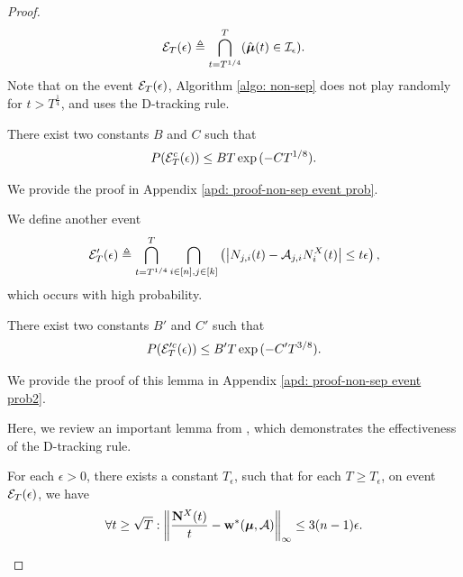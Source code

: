 \begin{proof}
    \begin{align*}
        \mathcal{E}_T(\epsilon) \triangleq \bigcap_{t = T^{1/4}}^T (\hat{\boldsymbol{\mu}}(t) \in \mathcal{I}_{\epsilon}).
    \end{align*}
    Note that on the event $\mathcal{E}_T(\epsilon)$, Algorithm \ref{algo: non-sep} does not play randomly for $t >  T^{\frac{1}{4}}$, and uses the D-tracking rule.

    \begin{lemma} \label{lem: non-sep event prob}
        There exist two constants $B$ and $C$ such that
        \begin{align*}
            P(\mathcal{E}^c_T(\epsilon)) \leq BT \exp{(-CT^{1/8})}.
        \end{align*}
    \end{lemma}
    We provide the proof in Appendix \ref{apd: proof-non-sep event prob}.
    
    We define another event 
    \begin{align*}
            \mathcal{E}'_T(\epsilon) \triangleq \bigcap_{t = T^{1/4}}^T \bigcap_{i \in [n], j \in [k]} \left(\left \vert N_{j,i}(t) - \mathcal{A}_{j, i}N^{X}_i(t) \right \vert \leq t \epsilon \right),
    \end{align*}
    which occurs with high probability.


     \begin{lemma} \label{lem: non-sep event prob2}
        There exist two constants $B'$ and $C'$ such that
        \begin{align*}
            P(\mathcal{E}'^c_T(\epsilon)) \leq B'T \exp{(-C'T^{3/8})}.
        \end{align*}
    \end{lemma}

    We provide the proof of this lemma in Appendix \ref{apd: proof-non-sep event prob2}.
        
    Here, we review an important lemma from \cite{track-stop-garivier2016optimal}, which demonstrates the effectiveness of the D-tracking rule.

    \begin{lemma}  \label{lem: d-tracking-sqrt}
        For each $\epsilon > 0$, there exists a constant $T_{\epsilon}$, such that for each $T \geq T_{\epsilon}$, on event $\mathcal{E}_T(\epsilon)$, we have
        \begin{align*}
            \forall t \geq \sqrt{T}: \left\Vert \frac{\mathbf{N}^{X}(t)}{t} - \mathbf{w}^*(\boldsymbol{\mu}, \mathcal{A}) \right\Vert _{\infty} \leq 3(n-1)\epsilon.
        \end{align*}
    \end{lemma}
   



\end{proof}
